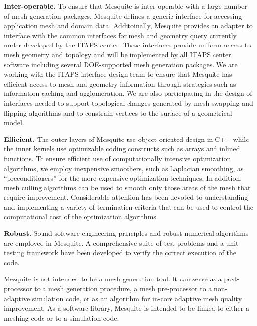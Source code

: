 {\bf Inter-operable.}  To ensure that Mesquite is inter-operable with a
large number of mesh generation packages, Mesquite defines a generic 
interface for accessing application mesh and domain data.  Additoinally,
Mesquite provides an adapter to interface with the common
interfaces for mesh and geometry query currently under developed by the 
ITAPS center.  These interfaces provide uniform access to mesh geometry and
topology and will be implemented by all ITAPS center software including
several DOE-supported mesh generation packages.  We are working with
the ITAPS interface design team to ensure that Mesquite has efficient
access to mesh and geometry information through strategies such as
information caching and agglomeration.  We are also participating in
the design of interfaces needed to support topological changes
generated by mesh swapping and flipping algorithms and to constrain
vertices to the surface of a geometrical model. \newline

{\bf Efficient.}  The outer layers of Mesquite use 
object-oriented design in C++ while the inner kernels use
optimizable coding constructs such as arrays and inlined
functions.  To ensure efficient use of computationally intensive
optimization algorithms, we employ inexpensive smoothers, such as
Laplacian smoothing, as ``preconditioners'' for the more expensive
optimization techniques.  In addition, mesh culling algorithms can be
used to smooth only those areas of the mesh that require improvement.
Considerable attention has been devoted to understanding and
implementing a variety of termination criteria that can be used to
control the computational cost of the optimization algorithms. \newline

{\bf Robust.} Sound software engineering principles and robust numerical 
algorithms are employed in Mesquite. 
A comprehensive suite of test problems and a unit testing framework have
been developed to verify the correct execution of the code. \newline

Mesquite is not intended to be a mesh generation tool. It can serve as 
a post-processor to a mesh generation procedure, a mesh pre-processor to a 
non-adaptive simulation code, or as an algorithm for in-core adaptive mesh 
quality improvement. As a software library, Mesquite is intended to be
linked to either a meshing code or to a simulation code. \newline

